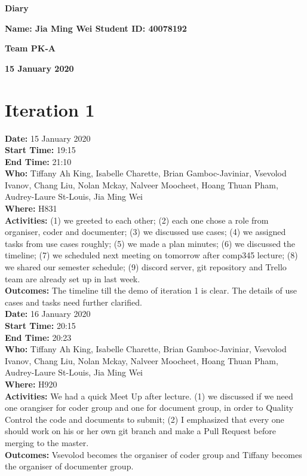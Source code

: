 \documentclass[12pt]{article}
\begin{document}
\vspace*{0.2in}
\centerline{\bf\Large Diary}

\vspace*{0.2in}
\centerline{\bf\Large Name: Jia Ming Wei   Student ID: 40078192}

\vspace*{0.2in}
\centerline{\bf\Large Team PK-A}

\vspace*{0.2in}
\centerline{\bf\Large 15 January 2020}

\section{Iteration 1}

{\bf Date:} 15 January 2020\\
{\bf Start Time:} 19:15\\
{\bf End Time:}  21:10\\
{\bf Who:} Tiffany Ah King,
Isabelle Charette,
Brian Gamboc-Javiniar,
Vsevolod Ivanov,
Chang Liu,
Nolan Mckay,
Nalveer Moocheet,
Hoang Thuan Pham,
Audrey-Laure St-Louis,
Jia Ming Wei\\
{\bf Where:} H831 \\
{\bf Activities:} (1) we greeted to each other; (2) each one chose a role from organiser, coder and documenter; (3) we discussed use cases; (4) we assigned tasks from use cases roughly; (5) we made a plan minutes; (6) we discussed the timeline; (7) we scheduled next meeting on tomorrow after comp345 lecture; (8) we shared our semester schedule; (9) discord server, git repository and Trello team are already set up in last week.  \\
{\bf Outcomes:} The timeline till the demo of iteration 1 is clear. The details of use cases and tasks need further clarified.\\

{\bf Date:} 16 January 2020\\
{\bf Start Time:} 20:15\\
{\bf End Time:}  20:23\\
{\bf Who:} Tiffany Ah King,
Isabelle Charette,
Brian Gamboc-Javiniar,
Vsevolod Ivanov,
Chang Liu,
Nolan Mckay,
Nalveer Moocheet,
Hoang Thuan Pham,
Audrey-Laure St-Louis,
Jia Ming Wei\\
{\bf Where:} H920 \\
{\bf Activities:} We had a quick Meet Up after lecture. (1) we discussed if we need one orangiser for coder group and one for document group, in order to Quality Control the code and documents to submit; (2) I emphasized that every one should work on his or her own git branch and make a Pull Request before merging to the master.\\
{\bf Outcomes:} Vsevolod becomes the organiser of coder group and Tiffany becomes the organiser of documenter group. \\


\end{document}
